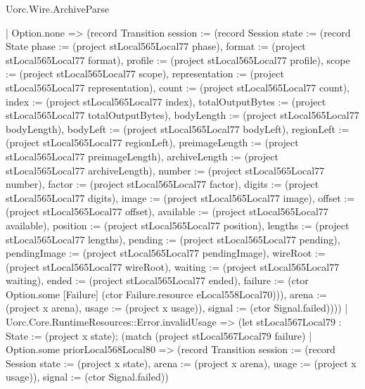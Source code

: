 \begin{lexlean}{Uorc.Wire.ArchiveParse}
\begin{semanticmodule}
{        | Option.none => (record Transition {session := (record Session {state := (record State {phase := (project stLocal565Local77 phase), format := (project stLocal565Local77 format), profile := (project stLocal565Local77 profile), scope := (project stLocal565Local77 scope), representation := (project stLocal565Local77 representation), count := (project stLocal565Local77 count), index := (project stLocal565Local77 index), totalOutputBytes := (project stLocal565Local77 totalOutputBytes), bodyLength := (project stLocal565Local77 bodyLength), bodyLeft := (project stLocal565Local77 bodyLeft), regionLeft := (project stLocal565Local77 regionLeft), preimageLength := (project stLocal565Local77 preimageLength), archiveLength := (project stLocal565Local77 archiveLength), number := (project stLocal565Local77 number), factor := (project stLocal565Local77 factor), digits := (project stLocal565Local77 digits), image := (project stLocal565Local77 image), offset := (project stLocal565Local77 offset), available := (project stLocal565Local77 available), position := (project stLocal565Local77 position), lengths := (project stLocal565Local77 lengths), pending := (project stLocal565Local77 pending), pendingImage := (project stLocal565Local77 pendingImage), wireRoot := (project stLocal565Local77 wireRoot), waiting := (project stLocal565Local77 waiting), ended := (project stLocal565Local77 ended), failure := (ctor Option.some [Failure] (ctor Failure.resource eLocal558Local70))}), arena := (project x arena), usage := (project x usage)}), signal := (ctor Signal.failed)})))
      | Uorc.Core.RuntimeResources::Error.invalidUsage => (let stLocal567Local79 : State := (project x state); (match (project stLocal567Local79 failure)
        | Option.some priorLocal568Local80 => (record Transition {session := (record Session {state := (project x state), arena := (project x arena), usage := (project x usage)}), signal := (ctor Signal.failed)})
}
\end{semanticmodule}
\end{lexlean}
